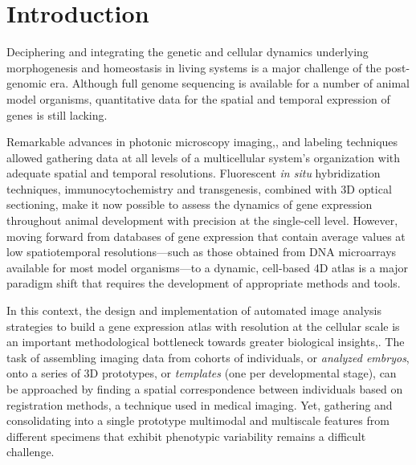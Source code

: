 \section*{Introduction}

Deciphering and integrating the genetic and cellular dynamics underlying morphogenesis and homeostasis in living systems is a major challenge of the post-genomic era. Although full genome sequencing is available for a number of animal model organisms\cite{schier2005molecular}, quantitative data for the spatial and temporal expression of genes is still lacking\cite{oates2009quantitative}.

Remarkable advances in photonic microscopy imaging\cite{megason2007imaging},\cite{abbott2009microscopic},\cite{supatto2011advances} and labeling techniques\cite{chudakov2010fluorescent} allowed gathering data at all levels of a multicellular system's organization with adequate spatial and temporal resolutions. Fluorescent \emph{in situ} hybridization techniques\cite{choi2010}, immunocytochemistry and transgenesis, combined with 3D optical sectioning, make it now possible to assess the dynamics of gene expression throughout animal development with precision at the single-cell level. However, moving forward from databases of gene expression that contain average values at low spatiotemporal resolutions---such as those obtained from DNA microarrays available for most model organisms---to a dynamic, cell-based 4D atlas is a major paradigm shift that requires the development of appropriate methods and tools.

In this context, the design and implementation of automated image analysis strategies to build a gene expression atlas with resolution at the cellular scale is an important methodological bottleneck towards greater biological insights\cite{luengo2011image},\cite{castro2012assembling}. The task of assembling imaging data from cohorts of individuals, or \emph{analyzed embryos}, onto a series of 3D prototypes, or \emph{templates} (one per developmental stage), can be approached by finding a spatial correspondence between individuals based on registration methods, a technique used in medical imaging\cite{zitova2003image}. Yet, gathering and consolidating into a single prototype multimodal and multiscale features from different specimens that exhibit phenotypic variability remains a difficult challenge.

